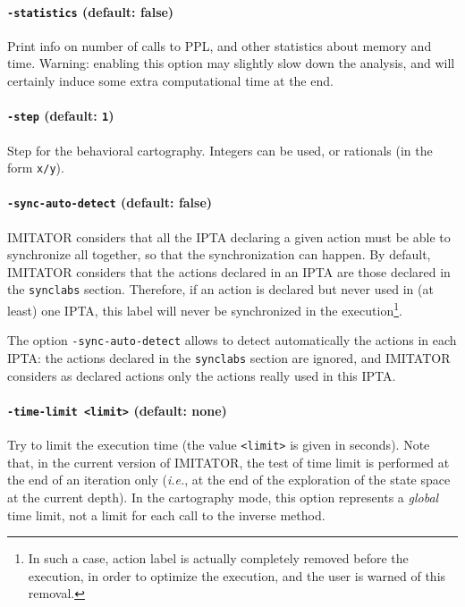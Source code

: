 \documentclass[a4paper,11pt]{report}
\newcommand{\imitator}{\textsf{IMITATOR}}
\newcommand{\IPTA}{IPTA}
\newcommand{\styleIMI}[1]{\textcolor{imicolor}{\texttt{#1}}}
\newcommand{\styleOption}[1]{\textcolor{optioncolor}{\texttt{#1}}}
\newcommand{\ie}{\textcolor{colorok}{\textit{i.e.}, }}
\begin{document}
\paragraph{\styleOption{-statistics} (default: false)}
Print info on number of calls to PPL, and other statistics about memory and time.
Warning: enabling this option may slightly slow down the analysis, and will certainly induce some extra computational time at the end.



\paragraph{\styleOption{-step} (default: \styleOption{1})}
Step for the behavioral cartography.
Integers can be used, or rationals (in the form \styleOption{x/y}).

\paragraph{\styleOption{-sync-auto-detect} (default: false)}
\imitator{} considers that all the \IPTA{} declaring a given action must be able to synchronize all together, so that the synchronization can happen.
By default, \imitator{} considers that the actions declared in an \IPTA{} are those declared in the \styleIMI{synclabs} section.
Therefore, if an action is declared but never used in (at least) one \IPTA{}, this label will never be synchronized in the execution\footnote{In such a case, action label is actually completely removed before the execution, in order to optimize the execution, and the user is warned of this removal.}.

The option \styleOption{-sync-auto-detect} allows to detect automatically the actions in each \IPTA{}: the actions declared in the \styleIMI{synclabs} section are ignored, and \imitator{} considers as declared actions only the actions really used in this \IPTA{}.


\paragraph{\styleOption{-time-limit <limit>} (default: none)}
Try to limit the execution time (the value \styleOption{<limit>} is given in seconds).
Note that, in the current version of \imitator{}, the test of time limit is performed at the end of an iteration only (\ie{} at the end of the exploration of the state space at the current depth).
In the cartography mode, this option represents a \emph{global} time limit, not a limit for each call to the inverse method.
\end{document}

